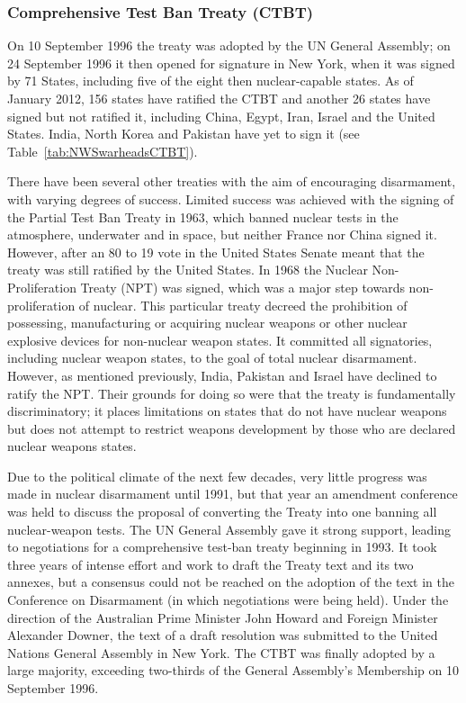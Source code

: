 \documentclass[twoside,titlepage,11pt,twocolumn,a4paper]{article}
\begin{document}
\subsubsection{Comprehensive Test Ban Treaty (CTBT)}
On 10 September 1996 the treaty was adopted by the UN General
Assembly; on 24 September 1996 it then opened for signature in New
York, when it was signed by 71 States, including five of the eight
then nuclear-capable states. As of January 2012, 156 states have
ratified the CTBT and another 26 states have signed but not ratified
it, including China, Egypt, Iran, Israel and the United States. India,
North Korea and Pakistan have yet to sign it (see
Table~\ref{tab:NWSwarheadsCTBT}).  

There have been several other treaties with the aim of 
encouraging disarmament, with varying degrees
of success. Limited success was achieved with the signing of the
Partial Test Ban Treaty in 1963, which banned nuclear tests in the
atmosphere, underwater and in space, but neither France nor China
signed it. However, after an 80 to 19 vote in the United States Senate
meant that the treaty was still ratified by the United States. In 1968
the Nuclear Non-Proliferation Treaty (NPT) was signed, which was a
major step towards non-proliferation of nuclear. This particular
treaty decreed the prohibition of possessing, manufacturing or
acquiring nuclear weapons or other nuclear explosive devices for
non-nuclear weapon states. It committed all signatories, including
nuclear weapon states, to the goal of total nuclear
disarmament. However, as mentioned previously, India, Pakistan and
Israel have declined to ratify the NPT. Their grounds for doing so
were that the treaty is fundamentally discriminatory; it places
limitations on states that do not have nuclear weapons but does not
attempt to restrict weapons development by those who are declared
nuclear weapons states.  

Due to the political climate of the next few
decades, very little progress was made in nuclear disarmament until
1991, but that year an amendment conference was held to discuss the
proposal of converting the Treaty into one banning all nuclear-weapon
tests. The UN General Assembly gave it strong support, leading to
negotiations for a comprehensive test-ban treaty beginning in 1993. It
took three years of intense effort and work to draft the Treaty text
and its two annexes, but a consensus could not be reached on the
adoption of the text in the Conference on Disarmament (in which
negotiations were being held). Under the direction of the Australian
Prime Minister John Howard and Foreign Minister Alexander Downer, the
text of a draft resolution was submitted to the United Nations General
Assembly in New York. The CTBT was finally adopted by a large
majority, exceeding two-thirds of the General Assembly's Membership on
10 September 1996.  
\end{document}
